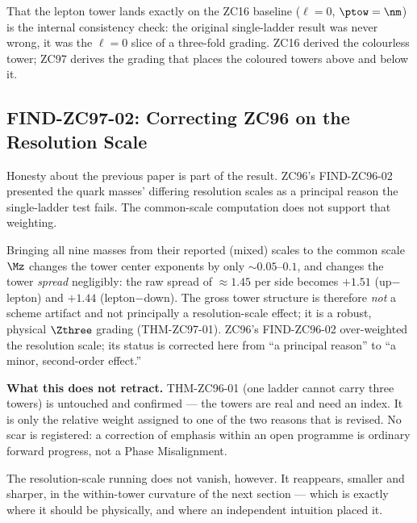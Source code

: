 \documentclass[12pt, a4paper]{article}
\begin{document}
That the lepton tower lands exactly on the ZC16 baseline ($\ell=0$, $\ptow=\nm$)
is the internal consistency check: the original single-ladder result was never
wrong, it was the $\ell=0$ slice of a three-fold grading. ZC16 derived the
colourless tower; ZC97 derives the grading that places the coloured towers above
and below it.

\subsection{FIND-ZC97-02: Correcting ZC96 on the Resolution Scale}
\label{sec:correction-zc97}

Honesty about the previous paper is part of the result. ZC96's FIND-ZC96-02
presented the quark masses' differing resolution scales as a principal reason
the single-ladder test fails. The common-scale computation does not support that
weighting.

\begin{formalbox}[title={FIND-ZC97-02: Resolution Scale Is the Smaller Effect}]
Bringing all nine masses from their reported (mixed) scales to the common scale
$\Mz$ changes the tower center exponents by only $\sim0.05$--$0.1$, and changes
the tower \emph{spread} negligibly: the raw spread of $\approx1.45$ per side
becomes $+1.51$ (up$-$lepton) and $+1.44$ (lepton$-$down). The gross tower
structure is therefore \emph{not} a scheme artifact and not principally a
resolution-scale effect; it is a robust, physical $\Zthree$ grading
(THM-ZC97-01). ZC96's FIND-ZC96-02 over-weighted the resolution scale; its
status is corrected here from ``a principal reason'' to ``a minor, second-order
effect.''

\textbf{What this does not retract.} THM-ZC96-01 (one ladder cannot carry three
towers) is untouched and confirmed --- the towers are real and need an index. It
is only the relative weight assigned to one of the two reasons that is revised.
No scar is registered: a correction of emphasis within an open programme is
ordinary forward progress, not a Phase Misalignment.
\end{formalbox}

The resolution-scale running does not vanish, however. It reappears, smaller and
sharper, in the within-tower curvature of the next section --- which is exactly
where it should be physically, and where an independent intuition placed it.
\end{document}
